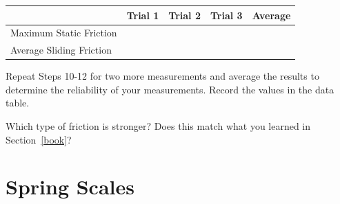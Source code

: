 \documentclass[10pt]{exam}
\begin{document}
\begin{questions}
\begin{minipage}[b]{11cm}
        
        \vspace{1cm}
          
        \begin{tabular}{|l
          *3{|>{\centering\arraybackslash}m{1cm}}
          ||>{\centering\arraybackslash}m{1.5cm}|}
          \hline
            & Trial 1 & Trial 2 & Trial 3 & Average \\\hline
          Maximum Static Friction &&&&\\[2em]\hline
          Average Sliding Friction &&&&\\[2em]\hline
        \end{tabular}

        \vspace{1cm}

      \end{minipage}
      


  \question
    Repeat Steps 10-12 for two more measurements and average the results to determine the reliability of your measurements. Record the values in the data table. 


  \question
    Which type of friction is stronger?  Does this match what you learned in Section~\ref{book}?
    \vs
  
\end{questions}

\pagebreak
\section{Spring Scales} \label{scales}
\end{document}
